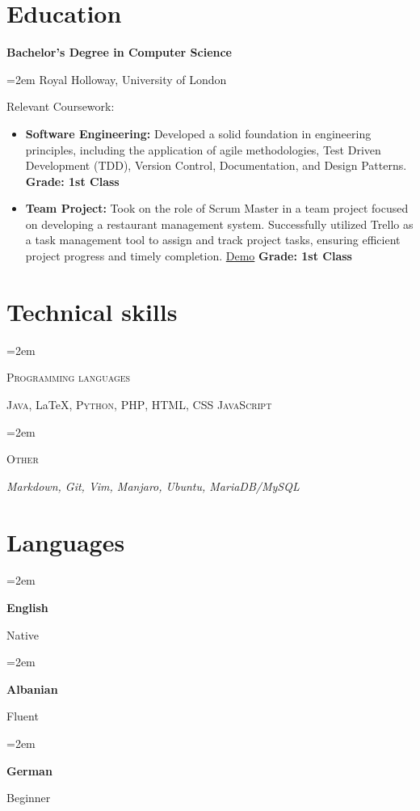 \documentclass[12pt]{article} %
\newlength{\spacebox}
\newcommand{\sepspace}{\vspace*{1em}}
\newcommand{\skill}[2]{ 
	
	
	\noindent\hangindent=2em\hangafter=0
	
	
	\parbox{3\spacebox}{%
		
		\textsc{#1}} %
	
	#2 \par} %
\newcommand{\lan}[2]{      
	
	
	\noindent\hangindent=2em\hangafter=0     
	
	
	\parbox{\spacebox}{%
		
		\textbf{#1}} %
	
	#2 \par}    %
\newcommand{\education}[4]{
	
	
	\noindent  \textbf{#1}   
	
	
	\hfill      
	
	\framebox{%
		
		\parbox{6em}{%
			
			\centering\textbf{#2}}} \par  
	
	
	\noindent \textit{#3} \par        %
	
	\noindent\hangindent=2em\hangafter=0 \small #4  
	
	
	\normalsize \par}
\begin{document}
	
	
	\section*{Education}
	
	\education{Bachelor's Degree in Computer Science}{2020-2024}
	\sepspace{Royal Holloway, University of London}
	{
		\sepspace
		Relevant Coursework:
		
		\begin{itemize}
			\item\textbf{Software Engineering:} Developed a solid foundation in engineering principles, including the application of agile methodologies, Test Driven Development (TDD), Version Control, Documentation, and Design Patterns.
			\textbf{Grade: 1st Class}
			\item\textbf{Team Project:} Took on the role of Scrum Master in a team project focused on developing a restaurant management system. Successfully utilized Trello as a task management tool to assign and track project tasks, ensuring efficient project progress and timely completion.
			\href{https://www.youtube.com/watch?v=PpJfEVGBtPg}{Demo}
			\textbf{Grade: 1st Class}
		\end{itemize}
	}
	
	
	\section*{Technical skills}
	
	
	
	\skill{Programming languages}{\textsc{Java},
	\LaTeX, \textsc{Python}, \textsc{PHP}, \textsc{HTML}, 
	\textsc{CSS} \textsc{JavaScript}} 
	\skill{Other}{\textsl{Markdown, Git, Vim, Manjaro, Ubuntu, MariaDB/MySQL}}
	
	
	
	
	\section*{Languages}
	
	\lan{English}{Native} 
	
	\lan{Albanian}{Fluent} 
	
	\lan{German}{Beginner}
	
\end{document}
